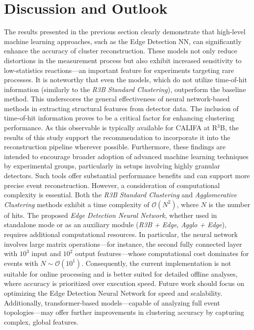 \documentclass[final,5p,times,twocolumn]{elsarticle}
\begin{document}
\section{Discussion and Outlook}\label{sec:disc_outlook}

The results presented in the previous section clearly demonstrate that high-level machine learning approaches, such as the Edge Detection NN, can significantly enhance the accuracy of cluster reconstruction. These models not only reduce distortions in the measurement process but also exhibit increased sensitivity to low-statistics reactions—an important feature for experiments targeting rare processes.\newline
It is noteworthy that even the models, which do not utilize time-of-hit information (similarly to the \textit{R3B Standard Clustering}), outperform the baseline method. This underscores the general effectiveness of neural network-based methods in extracting structural features from detector data.\newline
The inclusion of time-of-hit information proves to be a critical factor for enhancing clustering performance. As this observable is typically available for CALIFA at R$^3$B, the results of this study support the recommendation to incorporate it into the reconstruction pipeline wherever possible.\newline
Furthermore, these findings are intended to encourage broader adoption of advanced machine learning techniques by experimental groups, particularly in setups involving highly granular detectors. Such tools offer substantial performance benefits and can support more precise event reconstruction.\newline
However, a consideration of computational complexity is essential. Both the \textit{R3B Standard Clustering} and \textit{Agglomerative Clustering} methods exhibit a time complexity of $\mathcal{O}(N^2)$\cite{sieranoja2025fast}, where $N$ is the number of hits. The proposed \textit{Edge Detection Neural Network}, whether used in standalone mode or as an auxiliary module (\textit{R3B + Edge}, \textit{Agglo + Edge}), requires additional computational resources. In particular, the neural network involves large matrix operations—for instance, the second fully connected layer with $10^3$ input and $10^2$ output features—whose computational cost dominates for events with $N \sim \mathcal{O}(10^1)$. Consequently, the current implementation is not suitable for online processing and is better suited for detailed offline analyses, where accuracy is prioritized over execution speed.\newline
Future work should focus on optimizing the Edge Detection Neural Network for speed and scalability. Additionally, transformer-based models\cite{vaswani2017attention}—capable of analyzing full event topologies—may offer further improvements in clustering accuracy by capturing complex, global features.
\end{document}

